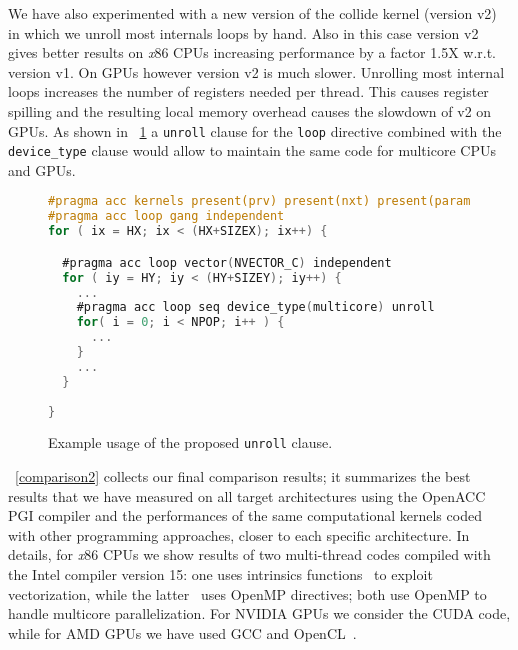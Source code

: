 \documentclass[times]{cpeauth}
\begin{document}
We have also experimented with a new version of the collide kernel 
(version v2) in which we unroll most internals loops by hand. Also 
in this case version v2 gives better results on {\em x}86 CPUs 
increasing performance by a factor 1.5X w.r.t. version v1. 
%
On GPUs however version v2 is much slower. Unrolling most internal loops increases the
number of registers needed per thread. This causes register spilling and the resulting
local memory overhead causes the slowdown of v2 on GPUs.
As shown in \figurename~\ref{fig:unrollclause} a {\tt unroll} clause for the {\tt loop}
directive combined with the {\tt device\_type} clause would allow to maintain the same code
for multicore CPUs and GPUs.

%
\begin{figure}
\centering
\begin{lstlisting}[language=C,basicstyle=\footnotesize]
#pragma acc kernels present(prv) present(nxt) present(param[0:1])
#pragma acc loop gang independent
for ( ix = HX; ix < (HX+SIZEX); ix++) {

  #pragma acc loop vector(NVECTOR_C) independent
  for ( iy = HY; iy < (HY+SIZEY); iy++) { 
    ...
    #pragma acc loop seq device_type(multicore) unroll
    for( i = 0; i < NPOP; i++ ) {
      ...
    }    
    ...
  }
  
}
\end{lstlisting}
\caption{\label{fig:unrollclause} Example usage of the proposed {\tt unroll} clause.}
\end{figure}
%

\tablename~\ref{comparison2} collects our final comparison results; it 
summarizes the best results that we have measured on all target architectures 
using the OpenACC PGI compiler and the performances of the same computational kernels 
coded with other programming approaches, closer to each specific architecture.  
%
In details, for {\em x}86 CPUs we show results of two multi-thread codes 
compiled with the Intel compiler version 15: one uses intrinsics functions~\cite{ccp12,caf13} 
to exploit vectorization, while the latter~\cite{ppam15} uses OpenMP directives; both 
use OpenMP to handle multicore parallelization.
%
For NVIDIA GPUs we consider the CUDA code, while for AMD GPUs we have used 
GCC and OpenCL~\cite{iccs14,europar14}. 

\end{document}
